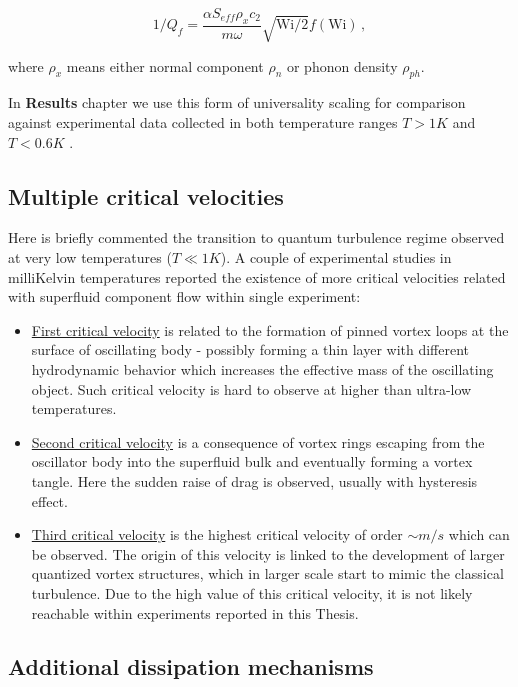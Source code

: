 \begin{equation}
1 / Q_f = \frac{\alpha S_{eff} \rho_x c_2}{m\omega} \sqrt{\text{Wi}/2} f(\text{Wi})\,,
\end{equation}

where $\rho_x$ means either normal component $\rho_n$ or phonon density $\rho_{ph}$.

In \textbf{Results} chapter we use this form of universality scaling for comparison against experimental data collected in both temperature ranges $T > 1\unit{K}$ and $T < 0.6\unit{K}$ .

\subsection*{Multiple critical velocities}

Here is briefly commented the transition to quantum turbulence regime observed at very low temperatures ($T \ll 1\unit{K}$). A couple of experimental studies in milliKelvin temperatures reported \cite{crit-velocity} the existence of more critical velocities related with superfluid component flow within single experiment:

\begin{itemize}
	\item \underline{First critical velocity} is related to the formation of pinned vortex loops at the surface of oscillating body - possibly forming a thin layer with different hydrodynamic behavior which increases the effective mass of the oscillating object. Such critical velocity is hard to observe at higher than ultra-low temperatures.

	\item \underline{Second critical velocity} is a consequence of vortex rings escaping from the oscillator body into the superfluid bulk and eventually forming a vortex tangle. Here the sudden raise of drag is observed, usually with hysteresis effect.

	\item \underline{Third critical velocity} is the highest critical velocity of order $\sim\unit{m/s}$ which can be observed. The origin of this velocity is linked to the development of larger quantized vortex structures, which in larger scale start to mimic the classical turbulence. Due to the high value of this critical velocity, it is not likely reachable within experiments reported in this Thesis.
\end{itemize}

\subsection*{Additional dissipation mechanisms}

